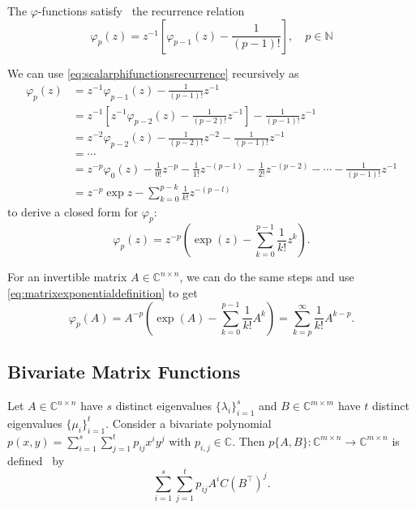 The $\varphi$-functions satisfy~\cite{higham2008functions} the recurrence relation
\begin{equation}
    \label{eq:scalarphifunctionsrecurrence}
    \varphi_p(z) = z^{-1} \left[ \varphi_{p-1}(z) - \frac{1}{(p-1)!} \right] ,
    \quad p \in \mathbb{N}
\end{equation}

We can use \autoref{eq:scalarphifunctionsrecurrence} recursively as
\begin{equation}
    \begin{aligned}
        \varphi_p(z) & = z^{-1} \varphi_{p-1}(z) - \frac{1}{(p-1)!} z^{-1} \\
        & = z^{-1} \left[ z^{-1} \varphi_{p-2}(z) - \frac{1}{(p-2)!} z^{-1} \right] - \frac{1}{(p-1)!} z^{-1} \\
        & = z^{-2} \varphi_{p-2}(z) - \frac{1}{(p-2)!} z^{-2} - \frac{1}{(p-1)!} z^{-1} \\
        & = \cdots \\
        & = z^{-p} \varphi_{0}(z) - \frac{1}{0!} z^{-p} - \frac{1}{1!} z^{-(p-1)} - \frac{1}{2!} z^{-(p-2)} - \cdots - \frac{1}{(p-1)!} z^{-1} \\
        & = z^{-p} \exp{z} - \sum_{k=0}^{p-k}{\frac{1}{k!}z^{-(p-l)}}
        \end{aligned}
\end{equation}
to derive a closed form for $\varphi_p$:
\begin{equation}
    \label{eq:scalarphifunctionsclosedform}
    \varphi_p(z) = z^{-p} \left( \exp(z) - \sum_{k=0}^{p-1}{\frac{1}{k!}z^{k}} \right).
\end{equation}

For an invertible matrix $A \in \mathbb{C}^{n \times n}$, we can do the same steps and use \autoref{eq:matrixexponentialdefinition}
to get
\begin{equation}
    \label{eq:matrixphifunctionsclosedform}
    \varphi_p(A) = A^{-p} \left( \exp(A) - \sum_{k=0}^{p-1}{\frac{1}{k!}A^{k}} \right) = \sum_{k=p}^{\infty}{\frac{1}{k!} A^{k-p}}.
\end{equation}

\subsection{Bivariate Matrix Functions}
Let $A \in \mathbb{C}^{n \times n}$ have $s$ distinct eigenvalues $\{\lambda_i\}_{i=1}^{s}$
and $B \in \mathbb{C}^{m \times m}$ have $t$ distinct eigenvalues $\{\mu_i\}_{i=1}^{t}$.
Consider a bivariate polynomial $p(x, y) = \sum_{i=1}^{s} \sum_{j=1}^{t} p_{ij} x^i y^j$
with $p_{i, j} \in \mathbb{C}$. Then $p\{A, B\}: \mathbb{C}^{m \times n} \to \mathbb{C}^{m \times n}$
is defined~\cite{kressner2014bivariate} by
\begin{equation}
    \sum_{i=1}^{s} \sum_{j=1}^{t} p_{ij} A^i C (B^\top)^j.
\end{equation}

